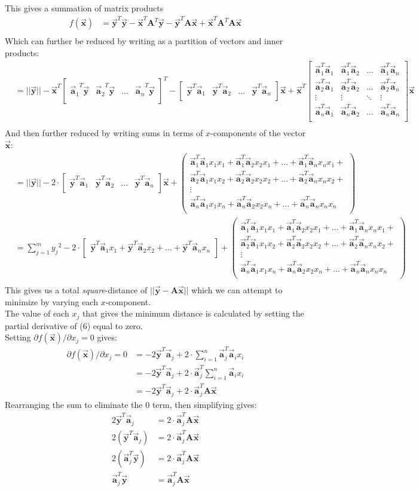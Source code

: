\documentclass[a4paper,10pt]{article}
\newcommand{\cA}{\ensuremath{\mathbf{A}}}
\newcommand{\cx}{\ensuremath{\vec{\mathbf{x}}}}
\newcommand{\cy}{\ensuremath{\vec{\mathbf{y}}}}
\newcommand{\cyt}{\ensuremath{\vec{\mathbf{y}}^{T}}}
\newcommand{\vLength}[1]{\ensuremath{\lvert\lvert{#1}\lvert\lvert}}
\newcommand{\caj}[1]{\ensuremath{\vec{\mathbf{a}}_{#1}}}
\newcommand{\cajt}[1]{\ensuremath{\vec{\mathbf{a}}^{T}_{#1}}}
\newcommand{\cxj}[1]{\ensuremath{x_{#1}}}
\newcommand{\cyi}[1]{\ensuremath{y_{#1}}}
\newcommand{\aay}{
	\ensuremath{
		\begin{bmatrix}
		\caj{1}^{T}\cy & \caj{2}^{T}\cy & \hdots & \caj{n}^{T}\cy \\
		\end{bmatrix}
	}
}
\newcommand{\aya}{
	\ensuremath{
		\begin{bmatrix}
		\cy^{T}\caj{1} & \cy^{T}\caj{2} & \hdots & \cy^{T}\caj{n} \\
		\end{bmatrix}
	}
}
\newcommand{\syax}{
	\ensuremath{
		\begin{bmatrix}
		\cy^{T}\caj{1}\cxj{1} + \cy^{T}\caj{2}\cxj{2} + \hdots + \cy^{T}\caj{n}\cxj{n} \\
		\end{bmatrix}
	}
}
\newcommand{\maa}{
	\ensuremath{
		\begin{bmatrix}
		\cajt{1}\caj{1} & \cajt{1}\caj{2} & \hdots & \cajt{1}\caj{n} \\
		\cajt{2}\caj{1} & \cajt{2}\caj{2} & \hdots & \cajt{2}\caj{n} \\
		\vdots & \vdots & \ddots & \vdots \\
		\cajt{n}\caj{1} & \cajt{n}\caj{2} & \hdots & \cajt{n}\caj{n} \\
		\end{bmatrix}
	}
}
\newcommand{\saaxx}{
	\ensuremath{
		\begin{pmatrix}
		\cajt{1}\caj{1}\cxj{1}\cxj{1} + \cajt{1}\caj{2}\cxj{2}\cxj{1} + \hdots + \cajt{1}\caj{n}\cxj{n}\cxj{1} + \\
		\cajt{2}\caj{1}\cxj{1}\cxj{2} + \cajt{2}\caj{2}\cxj{2}\cxj{2} + \hdots + \cajt{2}\caj{n}\cxj{n}\cxj{2} + \\
		\vdots  \\
		\cajt{n}\caj{1}\cxj{1}\cxj{n} + \cajt{n}\caj{2}\cxj{2}\cxj{n} + \hdots + \cajt{n}\caj{n}\cxj{n}\cxj{n} \\
		\end{pmatrix}
	}
}
\begin{document}
This gives a summation of matrix products
\begin{equation}
\begin{split}
f\left(\cx\right)&=\cy^{T}\cy - \cx^{T}\cA^{T}\cy - \cy^{T}\cA\cx+\cx^{T}\cA^{T}\cA\cx\\
\end{split}
\end{equation}
Which can further be reduced by writing as a partition of vectors and inner products:
\begin{equation}
\begin{split}
&=\vLength{\cy} - \cx^{T}\aay^{T} - \aya\cx
+\cx^{T}
\maa
\cx\\
\end{split}
\end{equation}
And then further reduced by writing sums in terms of $x$-components of the vector $\cx$:\\
\begin{equation}
\begin{split}
&=\vLength{\cy} - 2\cdot\aya\cx
+\saaxx\\
&=\sum^{m}_{j=1}{\cyi{j}^2} - 2\cdot\syax
+\saaxx\\
\end{split}
\end{equation}
This gives us a total \textit{square}-distance of $\vLength{\cy-\cA\cx}$ which we can attempt to minimize by varying each $x$-component.\\
The value of each $\cxj{j}$ that gives the minimum distance is calculated by setting the partial derivative of (6) equal to zero.\\
\break
Setting ${\partial{f\left(\cx\right)}}/{\partial\cxj{j}}=0$
gives:
\begin{equation}
\begin{split}
{\partial{f\left(\cx\right)}}/{\partial\cxj{j}}=0&=-2\cyt\caj{j}+2\cdot\sum_{i=1}^{n}\cajt{j}\caj{i}\cxj{i}\\
&=-2\cyt\caj{j}+2\cdot\cajt{j}\sum_{i=1}^{n}\caj{i}\cxj{i}\\
&=-2\cyt\caj{j}+2\cdot\cajt{j}\cA\cx
\end{split}
\end{equation}
Rearranging the sum to eliminate the 0 term, then simplifying gives:
\begin{equation}
\begin{split}
2\cyt\caj{j}&=2\cdot\cajt{j}\cA\cx\\
2\left(\cyt\caj{j}\right)&=2\cdot\cajt{j}\cA\cx\\
2\left(\cajt{j}\cy\right)&=2\cdot\cajt{j}\cA\cx\\
\cajt{j}\cy&=\cajt{j}\cA\cx\\
\end{split}
\end{equation}
\end{document}
